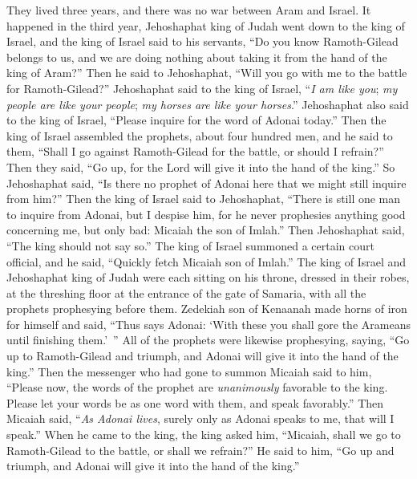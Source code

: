 \begin{biblechapter} %
 They lived three years, and there was no war between Aram and Israel.
\verse It happened in the third year, Jehoshaphat king of Judah went down to the king of Israel,
\verse and the king of Israel said to his servants, “Do you know Ramoth-Gilead belongs to us, and we are doing nothing about taking it from the hand of the king of Aram?”
\verse Then he said to Jehoshaphat, “Will you go with me to the battle for Ramoth-Gilead?” Jehoshaphat said to the king of Israel, “\textit{I am like you}; \textit{my people are like your people}; \textit{my horses are like your horses}.”
\verse Jehoshaphat also said to the king of Israel, “Please inquire for the word of Adonai today.”
\verse Then the king of Israel assembled the prophets, about four hundred men, and he said to them, “Shall I go against Ramoth-Gilead for the battle, or should I refrain?” Then they said, “Go up, for the Lord will give it into the hand of the king.”
\verse So Jehoshaphat said, “Is there no prophet of Adonai here that we might still inquire from him?”
\verse Then the king of Israel said to Jehoshaphat, “There is still one man to inquire from Adonai, but I despise him, for he never prophesies anything good concerning me, but only bad: Micaiah the son of Imlah.” Then Jehoshaphat said, “The king should not say so.”
\verse The king of Israel summoned a certain court official, and he said, “Quickly fetch Micaiah son of Imlah.”
\verse The king of Israel and Jehoshaphat king of Judah were each sitting on his throne, dressed in their robes, at the threshing floor at the entrance of the gate of Samaria, with all the prophets prophesying before them.
\verse Zedekiah son of Kenaanah made horns of iron for himself and said, “Thus says Adonai: ‘With these you shall gore the Arameans until finishing them.’ ”
\verse All of the prophets were likewise prophesying, saying, “Go up to Ramoth-Gilead and triumph, and Adonai will give it into the hand of the king.”
\verse Then the messenger who had gone to summon Micaiah said to him, “Please now, the words of the prophet are \textit{unanimously} favorable to the king. Please let your words be as one word with them, and speak favorably.”
\verse Then Micaiah said, “\textit{As Adonai lives}, surely only as Adonai speaks to me, that will I speak.”
\verse When he came to the king, the king asked him, “Micaiah, shall we go to Ramoth-Gilead to the battle, or shall we refrain?” He said to him, “Go up and triumph, and Adonai will give it into the hand of the king.”

\end{biblechapter}
